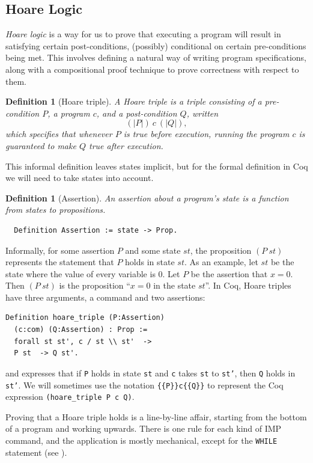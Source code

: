 \documentclass[compsoc,conference,a4paper,10pt,times]{IEEEtran}
\newtheorem{defin}[theorem]{Definition}
\begin{document}
\subsection{Hoare Logic}
\emph{Hoare logic} is a way for us to prove that executing a program will result in satisfying certain post-conditions, (possibly) conditional on certain pre-conditions being met.  This involves defining a natural way of writing program specifications, along with a compositional proof technique to prove correctness with respect to them.
\begin{defin}[Hoare triple]
	A \emph{Hoare triple} is a triple consisting of a pre-condition $P$, a program $c$, and a post-condition $Q$, written
    \[
    	(| P |)\ c\ (| Q |),
    \]
    which specifies that whenever $P$ is true before execution, running the program $c$ is guaranteed to make $Q$ true after execution.  
\end{defin}
This informal definition leaves states implicit, but for the formal definition in Coq we will need to take states into account.

\begin{defin}[Assertion]
An \emph{assertion} about a program's state is a function from states to propositions.
\begin{verbatim}   
  Definition Assertion := state -> Prop.
\end{verbatim}
\end{defin}
Informally, for some assertion $P$ and some state $st$, the proposition $(P~st)$ represents the statement that $P$ holds in state $st$.  
As an example, let $st$ be the state where the value of every variable is 0.  Let $P$ be the assertion that $x=0$.  Then $(P~st)$ is the proposition ``$x = 0$ in the state $st$''.  In Coq, Hoare triples have three arguments, a command and two assertions:
\begin{verbatim}
Definition hoare_triple (P:Assertion)
  (c:com) (Q:Assertion) : Prop :=
  forall st st', c / st \\ st'  ->
  P st  -> Q st'.
\end{verbatim}
and expresses that if \texttt{P} holds in state \texttt{st} and \texttt{c} takes \texttt{st} to \texttt{st'}, then \texttt{Q} holds in \texttt{st'}.  We will sometimes use the notation \texttt{\{\{P\}\}c\{\{Q\}\}}  to represent the Coq expression \texttt{(hoare\_triple P c Q)}.

Proving that a Hoare triple holds is a line-by-line affair, starting from the bottom of a program and working upwards.  There is one rule for each kind of IMP command, and the application is mostly mechanical, except for the \texttt{WHILE} statement (see \cite{SFV2}).
\end{document}
